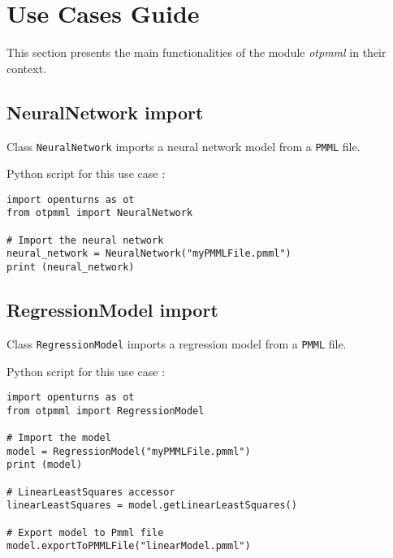 % 




\section{Use Cases Guide}

This section presents the main functionalities of the module \textit{otpmml} in their context.



\subsection{NeuralNetwork import}

Class \texttt{NeuralNetwork} imports a neural network model from a \texttt{PMML} file. 


Python script for this use case :

\begin{lstlisting}
import openturns as ot
from otpmml import NeuralNetwork

# Import the neural network
neural_network = NeuralNetwork("myPMMLFile.pmml")
print (neural_network)

\end{lstlisting}


\subsection{RegressionModel import}

Class \texttt{RegressionModel} imports a regression model from a \texttt{PMML} file.


Python script for this use case :

\begin{lstlisting}
import openturns as ot
from otpmml import RegressionModel

# Import the model
model = RegressionModel("myPMMLFile.pmml")
print (model)

# LinearLeastSquares accessor
linearLeastSquares = model.getLinearLeastSquares()

# Export model to Pmml file
model.exportToPMMLFile("linearModel.pmml")

\end{lstlisting}

